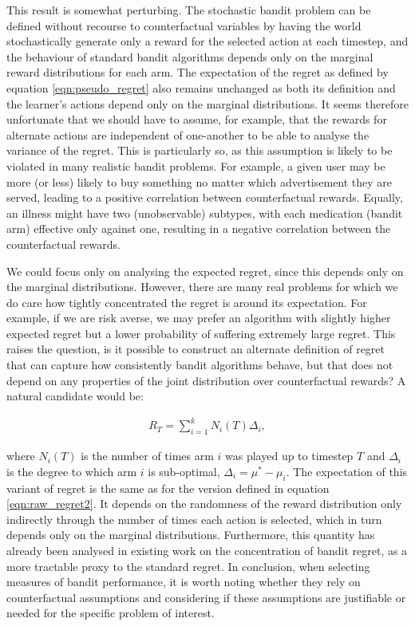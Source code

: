 \documentclass[11pt,a4paper,twoside]{report}
\newcommand{\eqn}[1]{\begin{align}#1\end{align}}
\theoremstyle{plain}
\theoremstyle{definition}
\begin{document}
This result is somewhat perturbing. The stochastic bandit problem can be defined without recourse to counterfactual variables by having the world stochastically generate only a reward for the selected action at each timestep, and the behaviour of standard bandit algorithms depends only on the marginal reward distributions for each arm. The expectation of the regret as defined by equation \ref{eqn:pseudo_regret} also remains unchanged as both its definition and the learner's actions depend only on the marginal distributions. It seems therefore unfortunate that we should have to assume, for example, that the rewards for alternate actions are independent of one-another to be able to analyse the variance of the regret. This is particularly so, as this assumption is likely to be violated in many realistic bandit problems. For example, a given user may be more (or less) likely to buy something no matter which advertisement they are served, leading to a positive correlation between counterfactual rewards. Equally, an illness might have two (unobservable) subtypes, with each medication (bandit arm) effective only against one, resulting in a negative correlation between the counterfactual rewards. 

We could focus only on analysing the expected regret, since this depends only on the marginal distributions. However, there are many real problems for which we do care how tightly concentrated the regret is around its expectation. For example, if we are risk averse, we may prefer an algorithm with slightly higher expected regret but a lower probability of suffering extremely large regret. This raises the question, is it possible to construct an alternate definition of regret that can capture how consistently bandit algorithms behave, but that does not depend on any properties of the joint distribution over counterfactual rewards? A natural candidate would be:

\eqn{
R_T = \sum_{i=1}^k N_i(T)\Delta_i, 
}

where $N_i(T)$ is the number of times arm $i$ was played up to timestep $T$ and $\Delta_i$ is the degree to which arm $i$ is sub-optimal, $\Delta_i = \mu^* - \mu_i$. The expectation of this variant of regret is the same as for the  version defined in equation \ref{eqn:raw_regret2}. It depends on the randomness of the reward distribution only indirectly through the number of times each action is selected, which in turn depends only on the marginal distributions. Furthermore, this quantity has already been analysed in existing work on the concentration of bandit regret, \citep{Audibert2007,Audibert2009exploration} as a more tractable proxy to the standard regret. In conclusion, when selecting measures of bandit performance, it is worth noting whether they rely on counterfactual assumptions and considering if these assumptions are justifiable or needed for the specific problem of interest.
\end{document}
